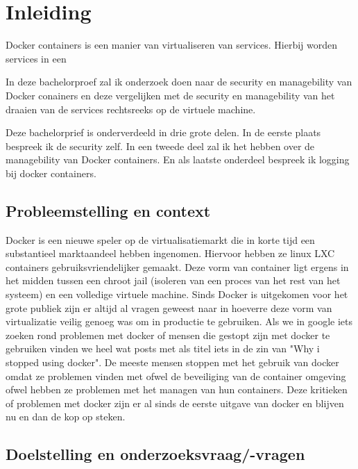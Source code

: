 \chapter{Inleiding}
\label{ch:inleiding}

Docker containers is een manier van virtualiseren van services. Hierbij worden services in een 

In deze bachelorproef zal ik onderzoek doen naar de security en managebility van Docker conainers en deze vergelijken met de security en managebility van het draaien van de services rechtsreeks op de virtuele machine.

Deze bachelorprief is onderverdeeld in drie grote delen. In de eerste plaats bespreek ik de security zelf. In een tweede deel zal ik het hebben over de managebility van Docker containers. En als laatste onderdeel bespreek ik logging bij docker containers.

\section{Probleemstelling en context}
\label{sec:onderzoeksvragen}


Docker is een nieuwe speler op de virtualisatiemarkt die in korte tijd een substantieel marktaandeel hebben ingenomen. Hiervoor hebben ze linux LXC containers gebruiksvriendelijker gemaakt. Deze vorm van container ligt ergens in het midden tussen een chroot jail (isoleren van een proces van het rest van het systeem) en een volledige virtuele machine. Sinds Docker is uitgekomen voor het grote publiek zijn er altijd al vragen geweest naar in hoeverre deze vorm van virtualizatie veilig genoeg was om in productie te gebruiken. Als we in google iets zoeken rond problemen met docker of mensen die gestopt zijn met docker te gebruiken vinden we heel wat posts met als titel iets in de zin van "Why i stopped using docker". De meeste mensen stoppen met het gebruik van docker omdat ze problemen vinden met ofwel de beveiliging van de container omgeving ofwel hebben ze problemen met het managen van hun containers. Deze kritieken of problemen met docker zijn er al sinds de eerste uitgave van docker en blijven nu en dan de kop op steken.  

\section{Doelstelling en onderzoeksvraag/-vragen}

